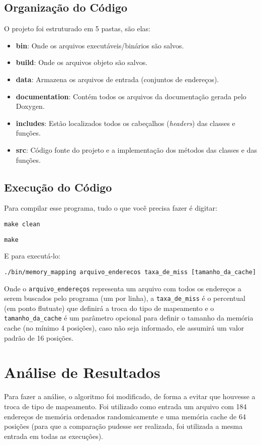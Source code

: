 \documentclass[12pt,openright,oneside,a4paper,english,brazil]{abntex2}
\newcommand{\code}[1]{\colorbox{codegray}{\texttt{#1}}}
\begin{document}
\section{Organização do Código}
O projeto foi estruturado em 5 pastas, são elas:
\begin{itemize}
\item \textbf{bin}:           Onde os arquivos executáveis/binários são salvos.
\item \textbf{build}:         Onde os arquivos objeto são salvos.
\item \textbf{data}:          Armazena os arquivos de entrada (conjuntos de endereços).
\item \textbf{documentation}: Contém todos os arquivos da documentação gerada pelo Doxygen.
\item \textbf{includes}:      Estão localizados todos os cabeçalhos (\textit{headers}) das classes e funções.
\item \textbf{src}:           Código fonte do projeto e a implementação dos métodos das classes e das funções.
\end{itemize}

\section{Execução do Código}
Para compilar esse programa, tudo o que você precisa fazer é digitar:

\code{\textdollar make clean}

\code{\textdollar make}

E para executá-lo:

\code{\textdollar ./bin/memory\_mapping arquivo\_enderecos taxa\_de\_miss [tamanho\_da\_cache]}

Onde o \code{arquivo\_endereços} representa um arquivo com todos os endereços a serem buscados pelo programa (um por linha), a \code{taxa\_de\_miss} é o percentual (em ponto flutuate) que definirá a troca do tipo de mapeamento e o \code{tamanho\_da\_cache} é um parâmetro opcional para definir o tamanho da memória cache (no mínimo 4 posições), caso não seja informado, ele assumirá um valor padrão de 16 posições.


\chapter{Análise de Resultados}
Para fazer a análise, o algoritmo foi modificado, de forma a evitar que houvesse a troca de tipo de mapeamento.
Foi utilizado como entrada um arquivo com 184 endereços de memória ordenados randomicamente e uma memória cache de 64 posições (para que a comparação pudesse ser realizada, foi utilizada a mesma entrada em todas as execuções).
\end{document}
